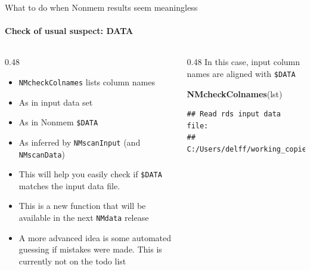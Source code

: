 \documentclass[
  8pt,
  ignorenonframetext,
  aspectratio=169]{beamer}
\newenvironment{Shaded}{\begin{snugshade}}{\end{snugshade}}
\newcommand{\KeywordTok}[1]{\textcolor[rgb]{0.13,0.29,0.53}{\textbf{#1}}}
\newcommand{\NormalTok}[1]{#1}
\providecommand{\tightlist}{%
  \setlength{\itemsep}{0pt}\setlength{\parskip}{0pt}}
\begin{document}
\begin{frame}[fragile]{What to do when Nonmem results seem meaningless}
\protect\hypertarget{what-to-do-when-nonmem-results-seem-meaningless}{}
\framesubtitle{Check of usual suspect: DATA}

\begin{columns}[T]
\begin{column}{0.48\textwidth}
\begin{itemize}
\tightlist
\item
  \texttt{NMcheckColnames} lists column names
\item
  As in input data set
\item
  As in Nonmem \texttt{\$DATA}
\item
  As inferred by \texttt{NMscanInput} (and \texttt{NMscanData})
\item
  This will help you easily check if \texttt{\$DATA} matches the input
  data file.
\item
  This is a new function that will be available in the next
  \texttt{NMdata} release
\item
  A more advanced idea is some automated guessing if mistakes were made.
  This is currently not on the todo list
\end{itemize}
\end{column}

\begin{column}{0.48\textwidth}
In this case, input column names are aligned with \texttt{\$DATA}
\footnotesize

\begin{Shaded}
\begin{Highlighting}[]
\KeywordTok{NMcheckColnames}\NormalTok{(lst)}
\end{Highlighting}
\end{Shaded}

\begin{verbatim}
## Read rds input data file:
## C:/Users/delff/working_copies/NMdata/inst/examples/data/xgxr2.rds.
\end{verbatim}


\end{column}
\end{columns}
\end{frame}
\end{document}
